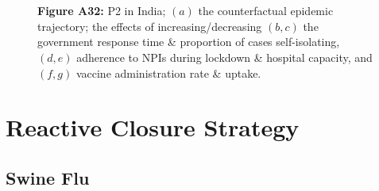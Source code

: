 \documentclass[paper=a4,fontsize=11pt]{article}
\begin{document}
\begin{figure}[!h]
  \\
  \hspace{1.76cm}
  \\
  \caption*{\textbf{Figure A32:} P2 in India; $(a)$ the counterfactual epidemic trajectory; the effects of increasing/decreasing $(b,c)$ the government response time \& proportion of cases self-isolating, $(d,e)$ adherence to NPIs during lockdown \& hospital capacity, and $(f,g)$ vaccine administration rate \& uptake.}
\end{figure}


\section{Reactive Closure Strategy}
\newpage


\subsection{Swine Flu}
\end{document}

